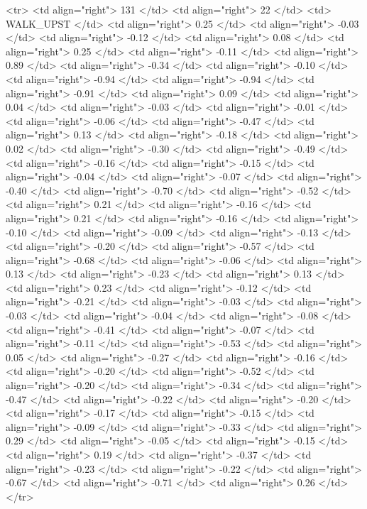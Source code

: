   <tr> <td align="right"> 131 </td> <td align="right">  22 </td> <td> WALK_UPST </td> <td align="right"> 0.25 </td> <td align="right"> -0.03 </td> <td align="right"> -0.12 </td> <td align="right"> 0.08 </td> <td align="right"> 0.25 </td> <td align="right"> -0.11 </td> <td align="right"> 0.89 </td> <td align="right"> -0.34 </td> <td align="right"> -0.10 </td> <td align="right"> -0.94 </td> <td align="right"> -0.94 </td> <td align="right"> -0.91 </td> <td align="right"> 0.09 </td> <td align="right"> 0.04 </td> <td align="right"> -0.03 </td> <td align="right"> -0.01 </td> <td align="right"> -0.06 </td> <td align="right"> -0.47 </td> <td align="right"> 0.13 </td> <td align="right"> -0.18 </td> <td align="right"> 0.02 </td> <td align="right"> -0.30 </td> <td align="right"> -0.49 </td> <td align="right"> -0.16 </td> <td align="right"> -0.15 </td> <td align="right"> -0.04 </td> <td align="right"> -0.07 </td> <td align="right"> -0.40 </td> <td align="right"> -0.70 </td> <td align="right"> -0.52 </td> <td align="right"> 0.21 </td> <td align="right"> -0.16 </td> <td align="right"> 0.21 </td> <td align="right"> -0.16 </td> <td align="right"> -0.10 </td> <td align="right"> -0.09 </td> <td align="right"> -0.13 </td> <td align="right"> -0.20 </td> <td align="right"> -0.57 </td> <td align="right"> -0.68 </td> <td align="right"> -0.06 </td> <td align="right"> 0.13 </td> <td align="right"> -0.23 </td> <td align="right"> 0.13 </td> <td align="right"> 0.23 </td> <td align="right"> -0.12 </td> <td align="right"> -0.21 </td> <td align="right"> -0.03 </td> <td align="right"> -0.03 </td> <td align="right"> -0.04 </td> <td align="right"> -0.08 </td> <td align="right"> -0.41 </td> <td align="right"> -0.07 </td> <td align="right"> -0.11 </td> <td align="right"> -0.53 </td> <td align="right"> 0.05 </td> <td align="right"> -0.27 </td> <td align="right"> -0.16 </td> <td align="right"> -0.20 </td> <td align="right"> -0.52 </td> <td align="right"> -0.20 </td> <td align="right"> -0.34 </td> <td align="right"> -0.47 </td> <td align="right"> -0.22 </td> <td align="right"> -0.20 </td> <td align="right"> -0.17 </td> <td align="right"> -0.15 </td> <td align="right"> -0.09 </td> <td align="right"> -0.33 </td> <td align="right"> 0.29 </td> <td align="right"> -0.05 </td> <td align="right"> -0.15 </td> <td align="right"> 0.19 </td> <td align="right"> -0.37 </td> <td align="right"> -0.23 </td> <td align="right"> -0.22 </td> <td align="right"> -0.67 </td> <td align="right"> -0.71 </td> <td align="right"> 0.26 </td> </tr>
